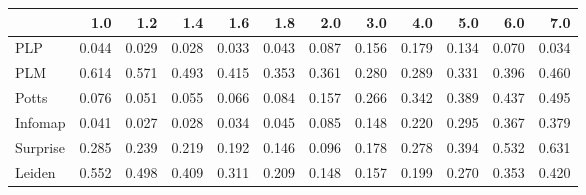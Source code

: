\begin{tabular}{lrrrrrrrrrrr}
\toprule
{} &   1.0 &   1.2 &   1.4 &   1.6 &   1.8 &   2.0 &   3.0 &   4.0 &   5.0 &   6.0 &   7.0 \\
\midrule
PLP      & 0.044 & 0.029 & 0.028 & 0.033 & 0.043 & 0.087 & 0.156 & 0.179 & 0.134 & 0.070 & 0.034 \\
PLM      & 0.614 & 0.571 & 0.493 & 0.415 & 0.353 & 0.361 & 0.280 & 0.289 & 0.331 & 0.396 & 0.460 \\
Potts    & 0.076 & 0.051 & 0.055 & 0.066 & 0.084 & 0.157 & 0.266 & 0.342 & 0.389 & 0.437 & 0.495 \\
Infomap  & 0.041 & 0.027 & 0.028 & 0.034 & 0.045 & 0.085 & 0.148 & 0.220 & 0.295 & 0.367 & 0.379 \\
Surprise & 0.285 & 0.239 & 0.219 & 0.192 & 0.146 & 0.096 & 0.178 & 0.278 & 0.394 & 0.532 & 0.631 \\
Leiden   & 0.552 & 0.498 & 0.409 & 0.311 & 0.209 & 0.148 & 0.157 & 0.199 & 0.270 & 0.353 & 0.420 \\
\bottomrule
\end{tabular}
